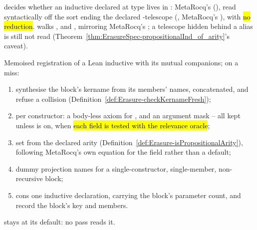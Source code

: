 \begin{definition}
\label{def:Erasure-isPropositionalArity}
\leanok
{}  decides whether an inductive declared at type
 lives in : MetaRocq's  (),
read syntactically off the sort ending the declared -telescope
(, MetaRocq's ), with \hl{no reduction}.
  walks ,  and ,
mirroring MetaRocq's ; a telescope hidden behind a  alias is still
not read (Theorem~\ref{thm:ErasureSpec-propositionalInd_of_arity}'s caveat).
\end{definition}

\begin{definition}
\label{def:Erasure-register_inductive}
\leanok
{} Memoised registration of a Lean inductive with its mutual companions; on a miss:
\begin{enumerate}
\item synthesise the block's kername from its members' names, concatenated, and refuse a
collision (Definition~\ref{def:Erasure-checkKernameFresh});
\item per constructor: a body-less axiom for , and an argument mask -- all kept
unless  is on, when \hl{each field is tested with the relevance
oracle};
\item set  from the declared arity (Definition~\ref{def:Erasure-isPropositionalArity}),
following MetaRocq's own equation for the field rather than a default;
\item dummy projection names for a single-constructor, single-member, non-recursive block;
\item cons one inductive declaration, carrying the block's parameter count, and record the block's
key and members.
\end{enumerate}
  stays at its default: no pass reads it.
\end{definition}

